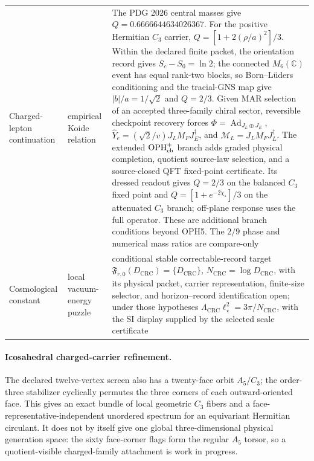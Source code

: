 \documentclass[11pt]{article}
\begin{document}
\begin{longtable}{@{}>{\raggedright\arraybackslash}p{}>{\raggedright\arraybackslash}p{}>{\raggedright\arraybackslash}p{}@{}}
Charged-lepton continuation & empirical Koide relation & The PDG 2026 central masses give \(Q=0.6666644634026367\). For the positive Hermitian \(C_3\) carrier, \(Q=[1+2(\rho/a)^2]/3\). Within the declared finite packet, the orientation record gives \(S_c-S_0=\ln2\); the connected \(M_6(\mathbb C)\) event has equal rank-two blocks, so Born--L\"uders conditioning and the tracial-GNS map give \(|b|/a=1/\sqrt2\) and \(Q=2/3\). Given MAR selection of an accepted three-family chiral sector, reversible checkpoint recovery forces \(\Phi=\operatorname{Ad}_{J_L\oplus J_E}\), \(\widehat Y_e=(\sqrt2/v)J_LM_FJ_E^\dagger\), and \(\mathcal M_L=J_LM_FJ_L^\dagger\). The extended \(\mathrm{OPH}^{+}_{\rm ch}\) branch adds graded physical completion, quotient source-law selection, and a source-closed QFT fixed-point certificate. Its dressed readout gives \(Q=2/3\) on the balanced \(C_3\) fixed point and \(Q=[1+e^{-2\chi_\star}]/3\) on the attenuated \(C_3\) branch; off-plane response uses the full operator. These are additional branch conditions beyond OPH5. The \(2/9\) phase and numerical mass ratios are compare-only \\
Cosmological constant & local vacuum-energy puzzle & conditional stable correctable-record target \(\mathfrak F_{r,0}(D_{\mathrm{CRC}})=\{D_{\mathrm{CRC}}\}\), \(N_{\mathrm{CRC}}=\log D_{\mathrm{CRC}}\), with its physical packet, carrier representation, finite-size selector, and horizon--record identification open; under those hypotheses \(\Lambda_{\mathrm{CRC}}\ell_\star^2=3\pi/N_{\mathrm{CRC}}\), with the SI display supplied by the selected scale certificate \\
\bottomrule
\end{longtable}
\endgroup

\paragraph{Icosahedral charged-carrier refinement.}
The declared twelve-vertex screen also has a twenty-face orbit
\(A_5/C_3\); the order-three stabilizer cyclically permutes the three corners
of each outward-oriented face.  This gives an exact bundle of local geometric
\(C_3\) fibers and a face-representative-independent unordered spectrum for an
equivariant Hermitian circulant.  It does not by itself give one global
three-dimensional physical generation space: the sixty face-corner flags form
the regular \(A_5\) torsor, so a quotient-visible charged-family attachment is
work in progress.
\end{document}
